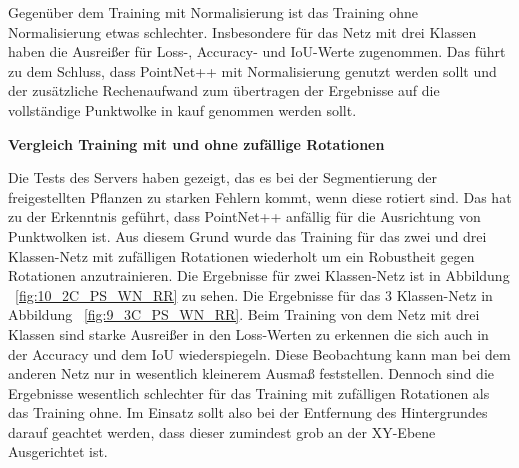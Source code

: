 \documentclass[12pt,titlepage, twoside]{article}
\begin{document}
Gegenüber dem Training mit Normalisierung ist das Training ohne Normalisierung etwas schlechter. Insbesondere für das Netz mit drei Klassen haben die Ausreißer für Loss-, Accuracy- und IoU-Werte zugenommen.
Das führt zu dem Schluss, dass PointNet++ mit Normalisierung genutzt werden sollt und der zusätzliche Rechenaufwand zum übertragen der Ergebnisse auf die vollständige Punktwolke in kauf genommen werden sollt.

\textbf{Vergleich Training mit und ohne zufällige Rotationen}

Die Tests des Servers haben gezeigt, das es bei der Segmentierung der freigestellten Pflanzen zu starken Fehlern kommt, wenn diese rotiert sind. 
Das hat zu der Erkenntnis geführt, dass PointNet++ anfällig für die Ausrichtung von Punktwolken ist. 
Aus diesem Grund wurde das Training für das zwei und drei Klassen-Netz mit zufälligen Rotationen wiederholt um ein Robustheit gegen Rotationen anzutrainieren.
Die Ergebnisse für zwei Klassen-Netz ist in Abbildung ~\ref{fig:10_2C_PS_WN_RR} zu sehen. Die Ergebnisse für das 3 Klassen-Netz in Abbildung ~\ref{fig:9_3C_PS_WN_RR}. 
Beim Training von dem Netz mit drei Klassen sind starke Ausreißer in den Loss-Werten zu erkennen die sich auch in der Accuracy und dem IoU wiederspiegeln.
Diese Beobachtung kann man bei dem anderen Netz nur in wesentlich kleinerem Ausmaß feststellen. Dennoch sind die Ergebnisse wesentlich schlechter für das Training mit zufälligen Rotationen als das Training ohne.
Im Einsatz sollt also bei der Entfernung des Hintergrundes darauf geachtet werden, dass dieser zumindest grob an der XY-Ebene Ausgerichtet ist.
\end{document}
